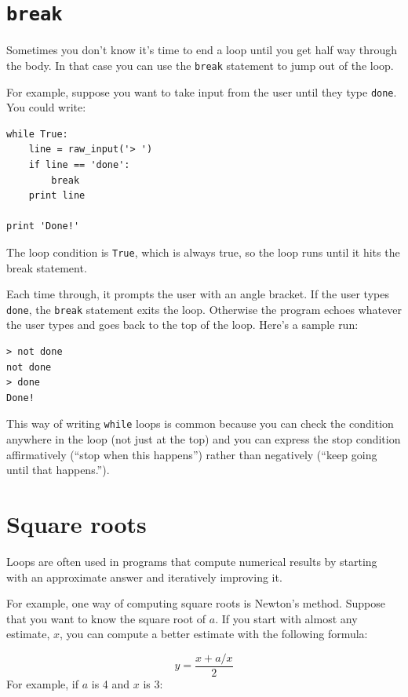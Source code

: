\documentclass[10pt]{book}
\begin{document}
\section{{\tt break}}

Sometimes you don't know it's time to end a loop until you get half
way through the body.  In that case you can use the {\tt break}
statement to jump out of the loop.

For example, suppose you want to take input from the user until they
type {\tt done}.  You could write:

\begin{verbatim}
while True:
    line = raw_input('> ')
    if line == 'done':
        break
    print line

print 'Done!'
\end{verbatim}
%
The loop condition is {\tt True}, which is always true, so the
loop runs until it hits the break statement.

Each time through, it prompts the user with an angle bracket.
If the user types {\tt done}, the {\tt break} statement exits
the loop.  Otherwise the program echoes whatever the user types
and goes back to the top of the loop.  Here's a sample run:

\begin{verbatim}
> not done
not done
> done
Done!
\end{verbatim}
%
This way of writing {\tt while} loops is common because you
can check the condition anywhere in the loop (not just at the
top) and you can express the stop condition affirmatively
(``stop when this happens'') rather than negatively (``keep going
until that happens.'').


\section{Square roots}
\label{squareroot}

Loops are often used in programs that compute
numerical results by starting with an approximate answer and
iteratively improving it.

For example, one way of computing square roots is Newton's method.
Suppose that you want to know the square root of $a$.  If you start
with almost any estimate, $x$, you can compute a better
estimate with the following formula:

\[ y = \frac{x + a/x}{2} \]
%
For example, if $a$ is 4 and $x$ is 3:
\end{document}
